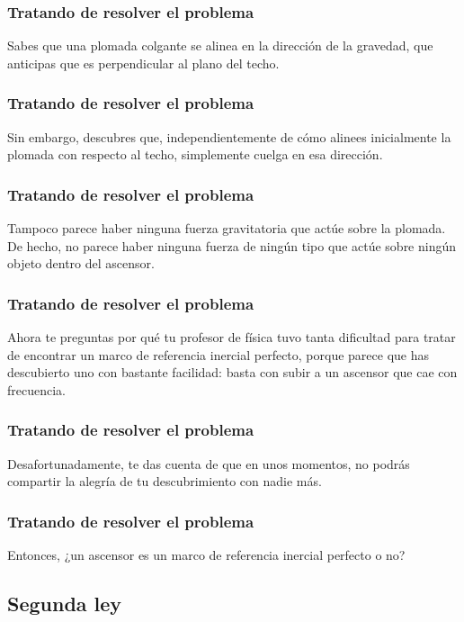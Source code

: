 \documentclass[12pt]{beamer}
\begin{document}
\begin{frame}
\frametitle{Tratando de resolver el problema}
Sabes que una plomada colgante se alinea en la dirección de la gravedad, que anticipas que es perpendicular al plano del techo.
\end{frame}
\begin{frame}
\frametitle{Tratando de resolver el problema}
Sin embargo, descubres que, independientemente de cómo alinees inicialmente la plomada con respecto al techo, simplemente cuelga en esa dirección.
\end{frame}
\begin{frame}
\frametitle{Tratando de resolver el problema}
Tampoco parece haber ninguna fuerza gravitatoria que actúe sobre la plomada.
\\
\bigskip
\pause
De hecho, no parece haber ninguna fuerza de ningún tipo que actúe sobre ningún objeto dentro del ascensor.
\end{frame}
\begin{frame}
\frametitle{Tratando de resolver el problema}
Ahora te preguntas por qué tu profesor de física tuvo tanta dificultad para tratar de encontrar un marco de referencia inercial perfecto, \pause porque parece que has descubierto uno con bastante facilidad: \pause basta con subir a un ascensor que cae con frecuencia.
\end{frame}
\begin{frame}
\frametitle{Tratando de resolver el problema}
Desafortunadamente, te das cuenta de que en unos momentos, no podrás compartir la alegría de tu descubrimiento con nadie más.
\end{frame}
\begin{frame}
\frametitle{Tratando de resolver el problema}
Entonces, \pause ¿un ascensor es un marco de referencia inercial perfecto o no?
\end{frame}

\subsection{Segunda ley}
\end{document}
